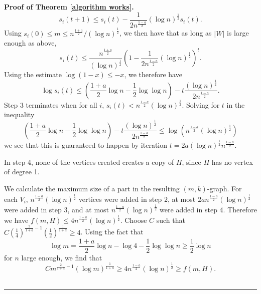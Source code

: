 \documentclass[10pt,a4paper]{amsart}
\newenvironment{proof}[1][Proof]{\noindent\textbf{#1.} }
{\hfill \ \rule{0.5em}{0.5em}}
\begin{document}
\begin{proof}[Proof of Theorem \ref{algorithm works}]
$$s_i(t+1)\le s_i(t)-\frac{1}{2n^\frac{1-a}{2}}(\log n)^{\frac{1}{2}}s_i(t).$$
Using $s_i(0)\le m\le n^\frac{1+a}{2}/(\log n)^{\frac{1}{2}}$, we then have that as long as $|W|$ is large enough as above, 
$$s_i(t)\le \frac{n^{\frac{1+a}{2}}}{(\log n)^{\frac{1}{2}}}\left(1-\frac{1}{2n^\frac{1-a}{2}}(\log n)^{\frac{1}{2}}\right)^t.$$
Using the estimate $\log(1-x)\le -x$, we therefore have
$$\log s_i(t)\le\left(\frac{1+a}{2}\log n-\frac{1}{2}\log\log n\right)-t\frac{(\log n)^{\frac{1}{2}}}{2n^{\frac{1-a}{2}}}.$$
Step 3 terminates when for all $i$, $s_i(t) < n^{\frac{1-a}{2}}(\log n)^{\frac{1}{2}}$. Solving for $t$ in the inequality
$$\left(\frac{1+a}{2}\log n-\frac{1}{2}\log\log n\right)-t\frac{(\log n)^{\frac{1}{2}}}{2n^{\frac{1-a}{2}}}\le\log\left(n^{\frac{1-a}{2}}(\log n)^{\frac{1}{2}}\right)$$
we see that this is guaranteed to happen by iteration $t=2a(\log n)^{\frac{1}{2}}n^{\frac{1-a}{2}}.$

In step 4, none of the vertices created creates a copy of $H$, since $H$ has no vertex of degree 1. 

We calculate the maximum size of a part in the resulting $(m,k)$-graph. For each $V_i$, $n^{\frac{1-a}{2}}(\log n)^{\frac{1}{2}}$ vertices were added in step 2, at most $2an^{\frac{1-a}{2}}(\log n)^{\frac{1}{2}}$ were added in step 3, and at most $n^{\frac{1-a}{2}}(\log n)^{\frac{1}{2}}$ were added in step 4. Therefore we have $f(m,H)\le 4n^{\frac{1-a}{2}}(\log n)^{\frac{1}{2}}$. Choose $C$ such that $C\left(\frac{1}{4}\right)^{\frac{2}{1+a}-1}\left(\frac{1}{2}\right)^{\frac{1}{1+a}}\ge 4$. Using the fact that
$$\log m=\frac{1+a}{2}\log n-\log4-\frac{1}{2}\log\log n\ge\frac{1}{2}\log n$$
for $n$ large enough, we find that
$$Cm^{\frac{2}{1+a}-1}(\log m)^{\frac{1}{1+a}}\ge 4n^{\frac{1-a}{2}}(\log n)^{\frac{1}{2}}\ge f(m,H).$$
\end{proof}
\end{document}
